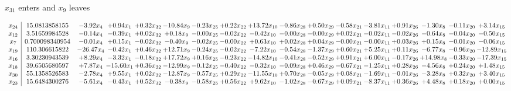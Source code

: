 \documentclass[9pt]{article}
\begin{document}
 $ x_{31} $ enters and $ x_{9} $ leaves 

 \[\begin{array}{c| c c@{\hskip 2pt} c@{\hskip 2pt} c@{\hskip 2pt} c@{\hskip 2pt} c@{\hskip 2pt} c@{\hskip 2pt} c@{\hskip 2pt} c@{\hskip 2pt} c@{\hskip 2pt} c@{\hskip 2pt} c@{\hskip 2pt} c@{\hskip 2pt} c@{\hskip 2pt} c@{\hskip 2pt} c@{\hskip 2pt} }
 x_{24}   &  15.0813858155 & -3.92 x_{4} & +  0.94 x_{1} & +  0.32 x_{32} & -10.84 x_{9} & -0.23 x_{25} & +  0.22 x_{22} & + 13.72 x_{10} & -0.86 x_{28} & +  0.50 x_{29} & -0.58 x_{21} & -3.81 x_{11} & +  0.91 x_{26} & -1.30 x_{8} & -0.11 x_{20} & +  3.14 x_{15}\\
 x_{12}   &  3.51659984528 & -0.14 x_{4} & -0.39 x_{1} & +  0.02 x_{32} & +  0.18 x_{9} & -0.00 x_{25} & -0.02 x_{22} & -0.42 x_{10} & -0.00 x_{28} & -0.00 x_{29} & +  0.02 x_{21} & -0.02 x_{11} & -0.02 x_{26} & -0.64 x_{8} & -0.04 x_{20} & -0.50 x_{15}\\
 x_{7}   &  0.700098340954 & -0.01 x_{4} & +  0.15 x_{1} & -0.02 x_{32} & -0.40 x_{9} & -0.02 x_{25} & -0.00 x_{22} & +  0.63 x_{10} & +  0.02 x_{28} & +  0.04 x_{29} & -0.00 x_{21} & -0.00 x_{11} & +  0.03 x_{26} & +  0.15 x_{8} & -0.01 x_{20} & -0.06 x_{15}\\
 x_{19}   &  110.306615822 & -26.47 x_{4} & -0.42 x_{1} & +  0.46 x_{32} & + 12.71 x_{9} & -0.24 x_{25} & -0.02 x_{22} & -7.22 x_{10} & -0.54 x_{28} & -1.37 x_{29} & +  0.60 x_{21} & +  5.25 x_{11} & +  0.11 x_{26} & -6.77 x_{8} & -0.96 x_{20} & -12.89 x_{15}\\
 x_{16}   &  3.30230943539 & +  8.29 x_{4} & -3.32 x_{1} & -0.18 x_{32} & + 17.72 x_{9} & +  0.16 x_{25} & -0.23 x_{22} & -14.82 x_{10} & -0.41 x_{28} & -0.52 x_{29} & +  0.91 x_{21} & +  6.00 x_{11} & -0.17 x_{26} & + 14.98 x_{8} & -0.33 x_{20} & -17.39 x_{15}\\
 x_{18}   &  39.6505680597 & +  7.87 x_{4} & -15.60 x_{1} & +  0.36 x_{32} & -12.99 x_{9} & -0.12 x_{25} & -0.40 x_{22} & -0.32 x_{10} & -0.09 x_{28} & +  0.46 x_{29} & -0.67 x_{21} & -1.25 x_{11} & +  0.28 x_{26} & -4.56 x_{8} & +  0.24 x_{20} & +  1.48 x_{15}\\
 x_{30}   &  55.1358526583 & -2.78 x_{4} & +  9.55 x_{1} & +  0.02 x_{32} & -12.87 x_{9} & -0.57 x_{25} & +  0.29 x_{22} & -11.55 x_{10} & +  0.70 x_{28} & -0.05 x_{29} & +  0.08 x_{21} & -1.69 x_{11} & -0.01 x_{26} & -3.28 x_{8} & +  0.32 x_{20} & +  3.40 x_{15}\\
 x_{23}   &  15.6484300276 & -5.61 x_{4} & -0.43 x_{1} & +  0.52 x_{32} & -0.38 x_{9} & -0.58 x_{25} & +  0.56 x_{22} & +  9.62 x_{10} & -1.02 x_{28} & -0.67 x_{29} & +  0.09 x_{21} & -8.37 x_{11} & +  0.36 x_{26} & +  4.48 x_{8} & +  0.18 x_{20} & +  0.00 x_{15}\\

\end{array}\]
\end{document}
